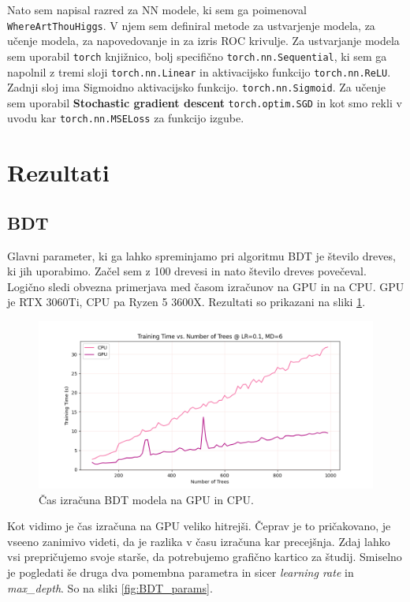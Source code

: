 \documentclass[a4paper]{article}
\begin{document}
Nato sem napisal razred za NN modele, ki sem ga poimenoval \texttt{WhereArtThouHiggs}. V njem sem definiral metode za
ustvarjenje modela, za učenje modela, za napovedovanje in za izris ROC krivulje. Za ustvarjanje modela sem uporabil
\texttt{torch} knjižnico, bolj specifično \texttt{torch.nn.Sequential}, ki sem ga napolnil z tremi sloji 
\texttt{torch.nn.Linear} in aktivacijsko funkcijo \texttt{torch.nn.ReLU}. Zadnji sloj ima Sigmoidno aktivacijsko funkcijo.
\texttt{torch.nn.Sigmoid}. Za učenje sem uporabil \textbf{Stochastic gradient descent} \texttt{torch.optim.SGD} in kot smo 
rekli v uvodu kar \texttt{torch.nn.MSELoss} za funkcijo izgube.
\section{Rezultati}
\subsection{BDT}
Glavni parameter, ki ga lahko spreminjamo pri algoritmu BDT je število dreves, ki jih uporabimo. Začel sem z 100 drevesi in
nato število dreves povečeval. Logično sledi obvezna primerjava med časom izračunov na GPU in na CPU. GPU je RTX 3060Ti,
CPU pa Ryzen 5 3600X. Rezultati so prikazani na sliki \ref{fig:BDT_times}. \\

\begin{figure}[H]
    \centering
    \includegraphics[width=1\textwidth]{../images/raw_performance.png}
    \caption{Čas izračuna BDT modela na GPU in CPU.}
    \label{fig:BDT_times}
\end{figure}

Kot vidimo je čas izračuna na GPU veliko hitrejši. Čeprav je to pričakovano, je vseeno zanimivo videti, da je razlika v času
izračuna kar precejšnja. Zdaj lahko vsi prepričujemo svoje starše, da potrebujemo grafično kartico za študij. Smiselno je pogledati
še druga dva pomembna parametra in sicer \textit{learning rate} in \textit{max\_depth}. So na sliki \ref{fig:BDT_params}. \\
\end{document}
